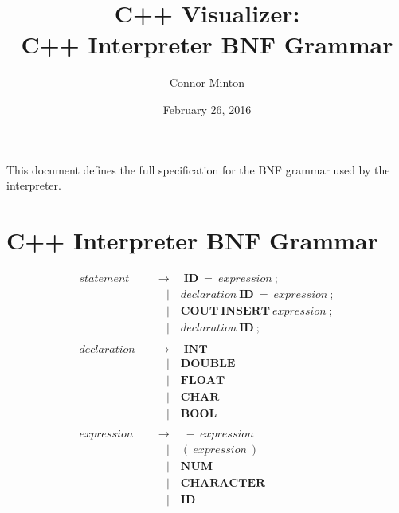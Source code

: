 \documentclass[12pt]{article}
\title{C++ Visualizer: \\ C++ Interpreter BNF Grammar}
\author{Connor Minton}
\date{February 26, 2016}
\begin{document}
\maketitle
This document defines the full specification for the BNF grammar used by the interpreter.

\section{C++ Interpreter BNF Grammar}
\begin{align*}
statement \quad & \to \quad \mathbf{ID} \ =\ expression\ ; \\
							& \quad | \quad declaration \ \mathbf{ID}\ =\ expression\ ; \\
							& \quad | \quad \mathbf{COUT}\ \mathbf{INSERT}\ expression\ ; \\
							& \quad | \quad declaration\ \mathbf{ID}\ ; \\\\
declaration \quad & \to \quad \mathbf{INT} \\
							& \quad | \quad \mathbf{DOUBLE} \\
							& \quad | \quad \mathbf{FLOAT} \\
							& \quad | \quad \mathbf{CHAR} \\
							& \quad | \quad \mathbf{BOOL} \\\\
expression \quad & \to \quad -\ expression \\
							& \quad | \quad ( \ expression\ )\\
							& \quad | \quad \mathbf{NUM}\\
							& \quad | \quad \mathbf{CHARACTER}\\
							& \quad | \quad \mathbf{ID}
\end{align*}
\end{document}
